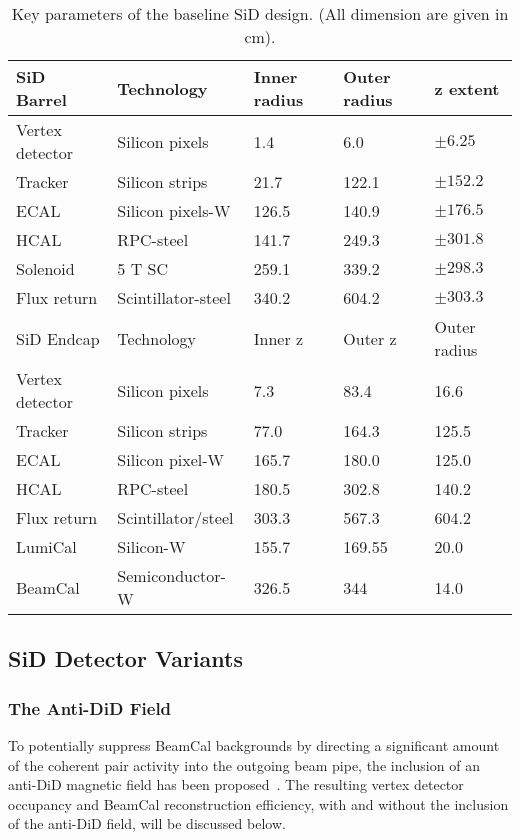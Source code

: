 \begin{table}
\caption{Key parameters of the baseline SiD design. (All dimension are given in cm).}
\label{tab:KeyParametersSiD}
\begin{tabular}{lllll}
\hline\hline
SiD Barrel & Technology & Inner radius & Outer radius & z extent \\
\hline
Vertex detector & Silicon pixels & 1.4 & 6.0 & $\pm 6.25$ \\
Tracker & Silicon strips & 21.7 & 122.1 & $\pm 152.2$ \\
ECAL & Silicon pixels-W & 126.5 & 140.9 & $\pm 176.5$ \\
HCAL & RPC-steel & 141.7 & 249.3 & $\pm 301.8$ \\
Solenoid & 5 T SC & 259.1 & 339.2 & $\pm 298.3$ \\
Flux return & Scintillator-steel & 340.2 & 604.2 & $\pm 303.3$ \\
\hline
SiD Endcap & Technology & Inner z & Outer z & Outer radius \\
\hline
Vertex detector & Silicon pixels & 7.3 & 83.4 & 16.6 \\
Tracker & Silicon strips & 77.0 & 164.3 & 125.5 \\
ECAL & Silicon pixel-W & 165.7 & 180.0 & 125.0 \\
HCAL & RPC-steel & 180.5 & 302.8 & 140.2 \\
Flux return & Scintillator/steel & 303.3 & 567.3 & 604.2 \\
LumiCal & Silicon-W & 155.7 & 169.55 &  20.0 \\
BeamCal & Semiconductor-W & 326.5 & 344 & 14.0 \\
\hline\hline
\end{tabular}
\end{table}

\subsection{SiD Detector Variants}

\subsubsection{The Anti-DiD Field}

To potentially suppress BeamCal backgrounds by directing a significant amount of the coherent pair activity into the outgoing beam pipe, the inclusion of an anti-DiD magnetic field has been proposed~\cite{ref:antiDiD}. The resulting vertex detector occupancy and BeamCal reconstruction efficiency, with and without the inclusion of the anti-DiD field, will be discussed below.




